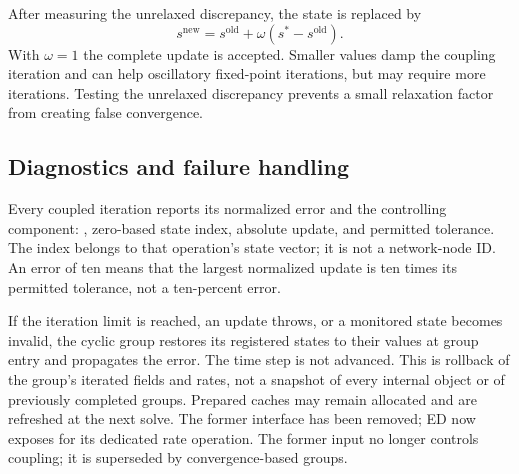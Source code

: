 After measuring the unrelaxed discrepancy, the state is replaced by
\begin{equation}
 s^{\mathrm{new}}=s^{\mathrm{old}}+\omega(s^*-s^{\mathrm{old}}).
\end{equation}
With $\omega=1$ the complete update is accepted. Smaller values damp the coupling iteration and can help oscillatory fixed-point iterations, but may require more iterations. Testing the unrelaxed discrepancy prevents a small relaxation factor from creating false convergence.

\subsection{Diagnostics and failure handling}
Every coupled iteration reports its normalized error and the controlling component: , zero-based state index, absolute update, and permitted tolerance. The index belongs to that operation's state vector; it is not a network-node ID. An error of ten means that the largest normalized update is ten times its permitted tolerance, not a ten-percent error.

If the iteration limit is reached, an update throws, or a monitored state becomes invalid, the cyclic group restores its registered states to their values at group entry and propagates the error. The time step is not advanced. This is rollback of the group's iterated fields and rates, not a snapshot of every internal object or of previously completed groups. Prepared caches may remain allocated and are refreshed at the next solve. The former  interface has been removed; ED now exposes  for its dedicated rate operation. The former  input no longer controls coupling; it is superseded by convergence-based groups.

